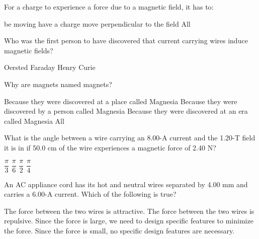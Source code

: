 \documentclass[11pt,addpoints]{exam}
\begin{document}
{{{\begin{questions}
					\question For a charge to experience a force due to a magnetic field, it has to: \\ \begin{oneparchoices} 
							\choice be moving
							\choice have a charge
							\choice move perpendicular to the field
							\choice All
					\end{oneparchoices}
					\question Who was the first person to have discovered that current carrying wires induce magnetic fields? \\ \begin{oneparchoices}
						\choice Oersted
						\choice Faraday
						\choice Henry
						\choice Curie
					\end{oneparchoices} 	 
					\question Why are magnets named magnets?
					\begin{choices}
						\choice Because they were discovered at a place called Magnesia
						\choice Because they were discovered by a person called Magnesia
						\choice Because they were discovered at an era called Magnesia
						\choice All
					\end{choices}
					\question What is the angle between a wire carrying an 8.00-A current and the 1.20-T field it is in if 50.0 cm of the wire experiences a magnetic force of 2.40 N? \\ \begin{oneparchoices}
						\choice $\dfrac{\pi}{3}$ 
						\choice $\dfrac{\pi}{6}$
						\choice $\dfrac{\pi}{2}$
						\choice $\dfrac{\pi}{4}$
					\end{oneparchoices}
					\question An AC appliance cord has its hot and neutral wires separated by 4.00 mm and carries a 6.00-A current. Which of the following is true?\begin{choices}
						\choice The force between the two wires is attractive.
						\choice The force between the two wires is repulsive.
						\choice Since the force is large, we need to design specific features to minimize the force.
						\choice Since the force is small, no specific design features are necessary.
					\end{choices}

\end{questions}}}}
\end{document}
